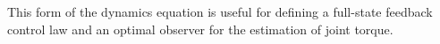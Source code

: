 \DIFaddbegin 

\DIFaddend This form of the dynamics equation is useful for defining a full-state feedback control law and an optimal observer for the estimation of joint torque. \DIFdelbegin %

\DIFdelend